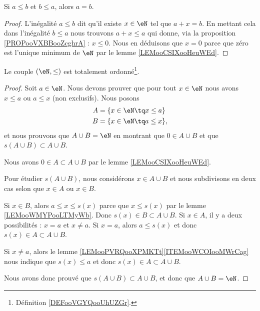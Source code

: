 \begin{lemma}       \label{LEMooJRZKooOMhOkH}
	Si \( a\leq b\) et \( b\leq a\), alors \( a=b\).
\end{lemma}

\begin{proof}
	L'inégalité \( a\leq b\) dit qu'il existe \( x\in \eN\) tel que \( a+x=b\). En mettant cela dans l'inégalité \( b\leq a\) nous trouvons \( a+x\leq a\) qui donne, via la proposition \ref{PROPooVXBBooZcghrA} : \( x\leq 0\). Nous en déduisons que \( x=0\) parce que zéro est l'unique minimum de \( \eN\) par le lemme \ref{LEMooCSIXooHeuWEd}.
\end{proof}

\begin{proposition}     \label{PROPooGCCRooFBYrlo}
	Le couple \( (\eN,\leq)\) est totalement ordonné\footnote{Définition \ref{DEFooVGYQooUhUZGr}.}.
\end{proposition}

\begin{proof}
	Soit \( a\in \eN\). Nous devons prouver que pour tout \( x\in \eN\) nous avons \( x\leq a\) ou \( a\leq x\) (non exclusifs). Nous posons
	\begin{subequations}
		\begin{align}
			A & =\{ x\in \eN\tq x\leq a \}  \\
			B & =\{ x\in \eN\tq a\leq x \},
		\end{align}
	\end{subequations}
	et nous prouvons que \( A\cup B=\eN\) en montrant que \( 0\in A\cup B\) et que \( s(A\cup B)\subset A\cup B\).

	Nous avons \( 0\in A\subset A\cup B\) par le lemme \ref{LEMooCSIXooHeuWEd}.

	Pour étudier \( s(A\cup B)\), nous considérons \( x\in A\cup B\) et nous subdivisons en deux cas selon que \( x\in A\) ou \( x\in B\).

	\begin{subproof}
		\spitem[Si \( x\in B\)]
		Si \( x\in B\), alors \( a\leq x\leq s(x)\) parce que \( x\leq s(x)\) par le lemme \ref{LEMooWMYPooLTMyWb}. Donc \( s(x)\in B\subset A\cup B\).
		\spitem[Si \( x\in A\)]
		Si \( x\in A\), il y a deux possibilités : \( x=a\) et \( x\neq a\). Si \( x=a\), alors \( a\leq s(x)\) et donc \( s(x)\in A\subset A\cup B\).

		Si \( x\neq a\), alors le lemme \ref{LEMooPVRQooXPMKTt}\ref{ITEMooWCOIooMWrCag} nous indique que \( s(x)\leq a\) et donc \( s(x)\in A\subset A\cup B\).
	\end{subproof}
	Nous avons donc prouvé que \( s(A\cup B)\subset A\cup B\), et donc que \( A\cup B=\eN\).
\end{proof}

